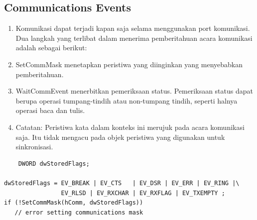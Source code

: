 			\subsection{Communications Events}
				\begin{enumerate}
				\item Komunikasi dapat terjadi kapan saja selama menggunakan port komunikasi. Dua langkah yang terlibat dalam menerima pemberitahuan acara komunikasi adalah sebagai berikut:

				\item SetCommMask menetapkan peristiwa yang diinginkan yang menyebabkan pemberitahuan.
			\item WaitCommEvent menerbitkan pemeriksaan status. Pemeriksaan status dapat berupa operasi tumpang-tindih atau non-tumpang tindih, seperti halnya operasi baca dan tulis.
				\item Catatan: Peristiwa kata dalam konteks ini merujuk pada acara komunikasi saja. Itu tidak mengacu pada objek peristiwa yang digunakan untuk sinkronisasi.


				\end{enumerate}
			
	\begin{verbatim}
	DWORD dwStoredFlags;

dwStoredFlags = EV_BREAK | EV_CTS   | EV_DSR | EV_ERR | EV_RING |\
                EV_RLSD | EV_RXCHAR | EV_RXFLAG | EV_TXEMPTY ;
if (!SetCommMask(hComm, dwStoredFlags))
   // error setting communications mask
\end{verbatim}

